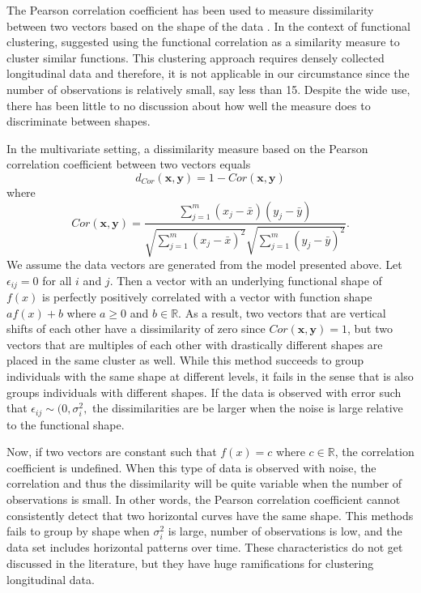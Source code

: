 \documentclass[12pt]{article}
\newcommand{\B}[0]{\mathbf}
\begin{document}
The Pearson correlation coefficient has been used to measure dissimilarity between two vectors based on the shape of the data  \cite{chouakria2007,  eisen1998, chiou2008}. In the context of functional clustering, \textcite{chiou2008} suggested using the functional correlation as a similarity measure to cluster similar functions. This clustering approach requires densely collected longitudinal data and therefore, it is not applicable in our circumstance since the number of observations is relatively small, say less than 15. Despite the wide use, there has been little to no discussion about how well the measure does to discriminate between shapes.

In the multivariate setting, a dissimilarity measure based on the Pearson correlation coefficient between two vectors equals 
$$d_{Cor}(\B x,\B y) = 1-Cor(\B x,\B y)$$ 
where $$Cor(\B x,\B y) = \frac{\sum^{m}_{j=1}(x_{j}-\bar{x})(y_{j}-\bar{y})}{\sqrt{\sum^{m}_{j=1}(x_{j}-\bar{x})^{2}}\sqrt{\sum^{m}_{j=1}(y_{j}-\bar{y})^{2}}}.$$
We assume the data vectors are generated from the model presented above. Let $\epsilon_{ij}=0$ for all $i$ and $j$. Then a vector with an underlying functional shape of $f(x)$ is perfectly positively correlated with a vector with function shape $af(x) + b$ where $a\geq0$ and $b\in\mathbb{R}$. As a result, two vectors that are vertical shifts of each other have a dissimilarity of zero since $Cor(\B x,\B y) = 1$, but two vectors that are multiples of each other with drastically different shapes are placed in the same cluster as well. While this method succeeds to group individuals with the same shape at different levels, it fails in the sense that is also groups individuals with different shapes. If the data is observed with error such that $\epsilon_{ij}\sim(0,\sigma_{i}^{2},$ the dissimilarities are be larger when the noise is large relative to the functional shape. 

Now, if two vectors are constant such that $f(x)=c$ where $c\in\mathbb{R}$,  the correlation coefficient is undefined. When this type of data is observed with noise, the correlation and thus the dissimilarity will be quite variable when the number of observations is small. In other words, the Pearson correlation coefficient cannot consistently detect that two horizontal curves have the same shape. This methods fails to group by shape when $\sigma_{i}^{2}$ is large, number of observations is low, and the data set includes horizontal patterns over time. These characteristics do not get discussed in the literature, but they have huge ramifications for clustering longitudinal data.
\end{document}
